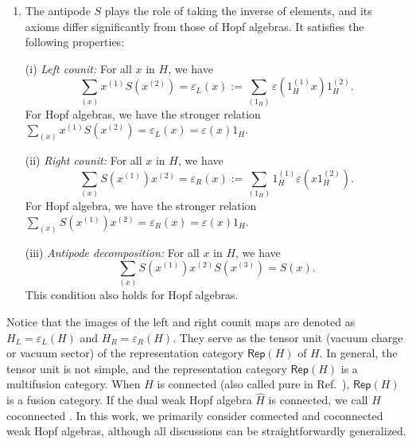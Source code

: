 \documentclass[a4paper,11pt]{article}
\theoremstyle{theorem}
\theoremstyle{remark}
\newcommand{\Rep}{\mathsf{Rep}}
\newcommand{\cone}{(1)}
\newcommand{\ctwo}{(2)}
\newcommand{\cthree}{(3)}
\begin{document}
\begin{enumerate}
(iii) \emph{Weak multiplicativity of the counit:} For all \(x, y, z \in H\), the counit satisfies  
\begin{equation}
\varepsilon(x \cdot y \cdot z) = \sum_{(y)} \varepsilon(x \cdot y^{\cone}) \varepsilon(y^{\ctwo} \cdot z) = \sum_{(y)} \varepsilon(x \cdot y^{\ctwo}) \varepsilon(y^{\cone} \cdot z).   
\end{equation}
For Hopf algebras, since \(\Delta(1_H) = 1_H \otimes 1_H\), setting \(y = 1\) in the above equation gives the stronger constraint \(\varepsilon(xz) = \varepsilon(x)\varepsilon(z)\).



\item The antipode \(S\) plays the role of taking the inverse of elements, and its axioms differ significantly from those of Hopf algebras. It satisfies the following properties:

(i)  \emph{Left counit:} For all $x$ in $H$, we have 
\begin{equation}    \sum_{(x)}x^{(1)}S(x^{\ctwo})=\varepsilon_L(x):=\sum_{(1_H)}\varepsilon(1_H^{\cone}x)1_H^{\ctwo}.
\end{equation}
For Hopf algebras, we have the stronger relation \( \sum_{(x)} x^{(1)} S(x^{\ctwo}) = \varepsilon_L(x) = \varepsilon(x) 1_H \).


(ii)  \emph{Right counit:} For all $x$ in $H$, we have 
\begin{equation}    \sum_{(x)}S(x^{(1)})x^{\ctwo}=\varepsilon_R(x):=\sum_{(1_H)}1_H^{\cone}\varepsilon(x1_H^{\ctwo}).
\end{equation}
For Hopf algebra, we have the stronger relation $\sum_{(x)}S(x^{(1)})x^{\ctwo}=\varepsilon_R(x)=\varepsilon(x)1_H$.



(iii)  \emph{Antipode decomposition:} For all $x$ in $H$, we have 
\begin{equation}
    \sum_{(x)}S(x^{\cone})x^{\ctwo}S(x^{\cthree})=S(x).
\end{equation}
This condition also holds for Hopf algebras.
\end{enumerate} 


Notice that the images of the left and right counit maps are denoted as \( H_L = \varepsilon_L(H) \) and \( H_R = \varepsilon_R(H) \). They serve as the tensor unit (vacuum charge or vacuum sector) of the representation category \( \Rep(H) \) of \( H \). In general, the tensor unit is not simple, and the representation category \( \Rep(H) \) is a multifusion category. When \( H \) is connected \cite{etingof2005fusion} (also called pure in Ref.~\cite{BOHM1998weak}), \( \Rep(H) \) is a fusion category.
If the dual weak Hopf algebra \( \hat{H} \) is connected, we call \( H \) coconnected \cite{Nikshych2004semisimpleWHA}. In this work, we primarily consider connected and coconnected weak Hopf algebras, although all discussions can be straightforwardly generalized.
\end{document}
